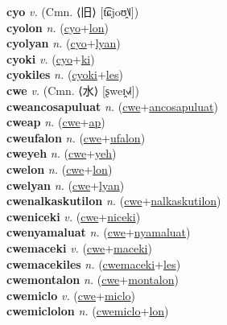 \textbf{cyo} \textit{v.} (Cmn. ⟨旧⟩ [t͡ɕjoʊ̯˥˩])
 \label{cyo} \\
\textbf{cyolon} \textit{n.} (\hyperref[cyo]{cyo}+\hyperref[lon]{lon})
 \label{cyolon} \\
\textbf{cyolyan} \textit{n.} (\hyperref[cyo]{cyo}+\hyperref[lyan]{lyan})
 \label{cyolyan} \\
\textbf{cyoki} \textit{v.} (\hyperref[cyo]{cyo}+\hyperref[ki]{ki})
 \label{cyoki} \\
\textbf{cyokiles} \textit{n.} (\hyperref[cyoki]{cyoki}+\hyperref[les]{les})
 \label{cyokiles} \\
\textbf{cwe} \textit{v.} (Cmn. ⟨水⟩ [ʂweɪ̯˧˩˧])
 \label{cwe} \\
\textbf{cweancosapuluat} \textit{n.} (\hyperref[cwe]{cwe}+\hyperref[ancosapuluat]{ancosapuluat})
 \label{cweancosapuluat} \\
\textbf{cweap} \textit{n.} (\hyperref[cwe]{cwe}+\hyperref[ap]{ap})
 \label{cweap} \\
\textbf{cweufalon} \textit{n.} (\hyperref[cwe]{cwe}+\hyperref[ufalon]{ufalon})
 \label{cweufalon} \\
\textbf{cweyeh} \textit{n.} (\hyperref[cwe]{cwe}+\hyperref[yeh]{yeh})
 \label{cweyeh} \\
\textbf{cwelon} \textit{n.} (\hyperref[cwe]{cwe}+\hyperref[lon]{lon})
 \label{cwelon} \\
\textbf{cwelyan} \textit{n.} (\hyperref[cwe]{cwe}+\hyperref[lyan]{lyan})
 \label{cwelyan} \\
\textbf{cwenalkaskutilon} \textit{n.} (\hyperref[cwe]{cwe}+\hyperref[nalkaskutilon]{nalkaskutilon})
 \label{cwenalkaskutilon} \\
\textbf{cweniceki} \textit{v.} (\hyperref[cwe]{cwe}+\hyperref[niceki]{niceki})
 \label{cweniceki} \\
\textbf{cwenyamaluat} \textit{n.} (\hyperref[cwe]{cwe}+\hyperref[nyamaluat]{nyamaluat})
 \label{cwenyamaluat} \\
\textbf{cwemaceki} \textit{v.} (\hyperref[cwe]{cwe}+\hyperref[maceki]{maceki})
 \label{cwemaceki} \\
\textbf{cwemacekiles} \textit{n.} (\hyperref[cwemaceki]{cwemaceki}+\hyperref[les]{les})
 \label{cwemacekiles} \\
\textbf{cwemontalon} \textit{n.} (\hyperref[cwe]{cwe}+\hyperref[montalon]{montalon})
 \label{cwemontalon} \\
\textbf{cwemiclo} \textit{v.} (\hyperref[cwe]{cwe}+\hyperref[miclo]{miclo})
 \label{cwemiclo} \\
\textbf{cwemiclolon} \textit{n.} (\hyperref[cwemiclo]{cwemiclo}+\hyperref[lon]{lon})

